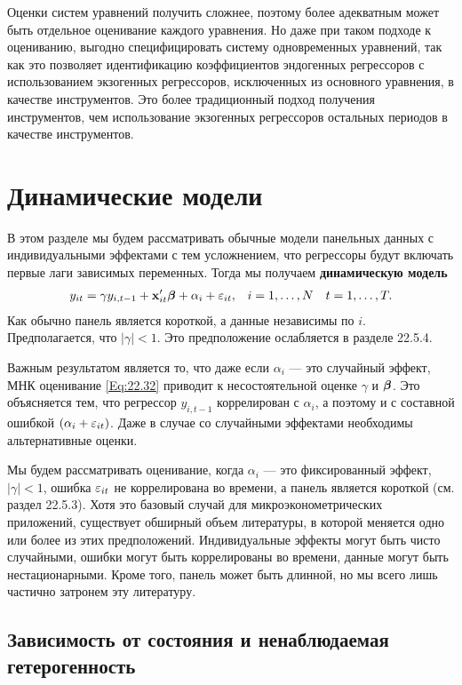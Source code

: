 Оценки систем уравнений получить сложнее, поэтому более адекватным может быть отдельное оценивание каждого уравнения. Но даже при таком подходе к оцениванию, выгодно специфицировать систему одновременных уравнений, так как это позволяет идентификацию коэффициентов эндогенных регрессоров с использованием экзогенных регрессоров, исключенных из основного уравнения, в качестве инструментов.  Это более традиционный подход получения инструментов, чем использование экзогенных регрессоров остальных периодов в качестве инструментов.


\section{Динамические модели}

В этом разделе мы будем рассматривать обычные модели панельных данных с индивидуальными эффектами с тем усложнением, что регрессоры будут включать первые лаги зависимых переменных. Тогда мы получаем \textbf{динамическую модель}
\begin{align}
& y_{it}=\gamma y_{i,t-1} +\mathbf{x}'_{it} \bm{\beta} +\alpha_i+\varepsilon_{it},
& i=1, \dots, N &
&t=1, \dots, T.
\label{Eq:22.32}
\end{align}
Как обычно панель является короткой, а данные  независимы по $i$. Предполагается, что $|\gamma| < 1$. Это предположение ослабляется в разделе 22.5.4.

Важным результатом является то, что даже если $\alpha_i$  --- это случайный эффект, МНК оценивание \ref{Eq:22.32} приводит к несостоятельной оценке $\gamma$  и $\bm{\beta}$. Это объясняется тем, что регрессор $y_{i,t-1}$ коррелирован с $\alpha_i$, а поэтому и с составной ошибкой $(\alpha_i+\varepsilon_{it})$. Даже в случае со случайными эффектами необходимы альтернативные оценки.

Мы будем рассматривать оценивание, когда $\alpha_i$ --- это фиксированный эффект, $|\gamma| <1$, ошибка $\varepsilon_{it}$ не коррелирована во времени, а панель является короткой (см. раздел 22.5.3). Хотя это базовый случай для микроэконометрических приложений, существует обширный объем литературы, в которой меняется одно или более из этих предположений. Индивидуальные эффекты могут быть чисто случайными, ошибки могут быть коррелированы во времени, данные могут быть нестационарными. Кроме того, панель может быть длинной, но мы всего лишь частично затронем эту литературу. 

\subsection{Зависимость от состояния и ненаблюдаемая гетерогенность}

